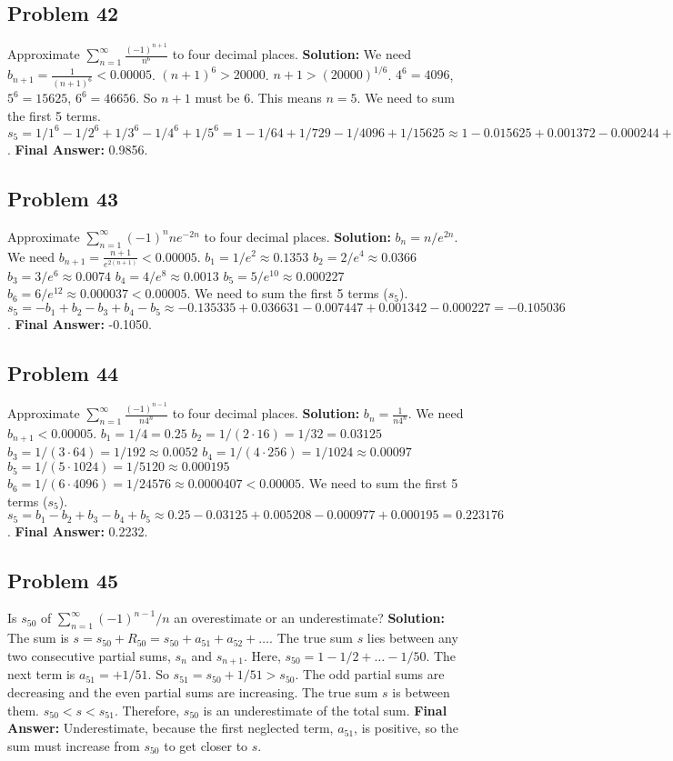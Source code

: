 \documentclass{article}
\begin{document}
\subsection*{Problem 42}
Approximate $\sum_{n=1}^{\infty} \frac{(-1)^{n+1}}{n^6}$ to four decimal places.
\textbf{Solution:} We need $b_{n+1} = \frac{1}{(n+1)^6} < 0.00005$.
$(n+1)^6 > 20000$.
$n+1 > (20000)^{1/6}$. $4^6=4096$, $5^6=15625$, $6^6=46656$. So $n+1$ must be 6.
This means $n=5$. We need to sum the first 5 terms.
$s_5 = 1/1^6 - 1/2^6 + 1/3^6 - 1/4^6 + 1/5^6 = 1 - 1/64 + 1/729 - 1/4096 + 1/15625 \approx 1 - 0.015625 + 0.001372 - 0.000244 + 0.000064 = 0.985567$.
\textbf{Final Answer:} 0.9856.

\subsection*{Problem 43}
Approximate $\sum_{n=1}^{\infty} (-1)^n n e^{-2n}$ to four decimal places.
\textbf{Solution:} $b_n = n/e^{2n}$. We need $b_{n+1} = \frac{n+1}{e^{2(n+1)}} < 0.00005$.
$b_1 = 1/e^2 \approx 0.1353$
$b_2 = 2/e^4 \approx 0.0366$
$b_3 = 3/e^6 \approx 0.0074$
$b_4 = 4/e^8 \approx 0.0013$
$b_5 = 5/e^{10} \approx 0.000227$
$b_6 = 6/e^{12} \approx 0.000037 < 0.00005$.
We need to sum the first 5 terms ($s_5$).
$s_5 = -b_1+b_2-b_3+b_4-b_5 \approx -0.135335 + 0.036631 - 0.007447 + 0.001342 - 0.000227 = -0.105036$.
\textbf{Final Answer:} -0.1050.

\subsection*{Problem 44}
Approximate $\sum_{n=1}^{\infty} \frac{(-1)^{n-1}}{n 4^n}$ to four decimal places.
\textbf{Solution:} $b_n = \frac{1}{n 4^n}$. We need $b_{n+1} < 0.00005$.
$b_1 = 1/4 = 0.25$
$b_2 = 1/(2 \cdot 16) = 1/32 = 0.03125$
$b_3 = 1/(3 \cdot 64) = 1/192 \approx 0.0052$
$b_4 = 1/(4 \cdot 256) = 1/1024 \approx 0.00097$
$b_5 = 1/(5 \cdot 1024) = 1/5120 \approx 0.000195$
$b_6 = 1/(6 \cdot 4096) = 1/24576 \approx 0.0000407 < 0.00005$.
We need to sum the first 5 terms ($s_5$).
$s_5 = b_1 - b_2 + b_3 - b_4 + b_5 \approx 0.25 - 0.03125 + 0.005208 - 0.000977 + 0.000195 = 0.223176$.
\textbf{Final Answer:} 0.2232.

\subsection*{Problem 45}
Is $s_{50}$ of $\sum_{n=1}^\infty (-1)^{n-1}/n$ an overestimate or an underestimate?
\textbf{Solution:} The sum is $s = s_{50} + R_{50} = s_{50} + a_{51} + a_{52} + \dots$.
The true sum $s$ lies between any two consecutive partial sums, $s_n$ and $s_{n+1}$.
Here, $s_{50} = 1 - 1/2 + \dots - 1/50$. The next term is $a_{51} = +1/51$. So $s_{51} = s_{50} + 1/51 > s_{50}$.
The odd partial sums are decreasing and the even partial sums are increasing. The true sum $s$ is between them.
$s_{50} < s < s_{51}$.
Therefore, $s_{50}$ is an underestimate of the total sum.
\textbf{Final Answer:} Underestimate, because the first neglected term, $a_{51}$, is positive, so the sum must increase from $s_{50}$ to get closer to $s$.
\end{document}
